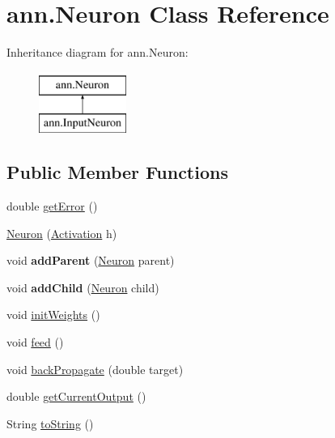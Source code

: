 \hypertarget{classann_1_1_neuron}{}\section{ann.\+Neuron Class Reference}
\label{classann_1_1_neuron}
Inheritance diagram for ann.\+Neuron\+:\begin{figure}[H]
\begin{center}
\leavevmode
\includegraphics[height=2.000000cm]{classann_1_1_neuron}
\end{center}
\end{figure}
\subsection*{Public Member Functions}
\begin{DoxyCompactItemize}
\item 
double \hyperlink{classann_1_1_neuron_adaea18e61d0a87b9e47cc41c552417dd}{get\+Error} ()
\item 
\hyperlink{classann_1_1_neuron_ab0f583ed1a1c83ed5ff5bc24c77db902}{Neuron} (\hyperlink{interfaceann_1_1_activation}{Activation} h)
\item 
\mbox{\label{classann_1_1_neuron_a0ba98646afe2473db08616ceffe80551}} 
void {\bfseries add\+Parent} (\hyperlink{classann_1_1_neuron}{Neuron} parent)
\item 
\mbox{\label{classann_1_1_neuron_a84df35de6af704840e26dd618ea62cdf}} 
void {\bfseries add\+Child} (\hyperlink{classann_1_1_neuron}{Neuron} child)
\item 
void \hyperlink{classann_1_1_neuron_aa1544b3c4a7e5a002eef88277126d4f5}{init\+Weights} ()
\item 
void \hyperlink{classann_1_1_neuron_aaae37fc2d90b1f42b4fd4ba00e23dc04}{feed} ()
\item 
void \hyperlink{classann_1_1_neuron_acb5bda80a06130b2c68bba370ee27a84}{back\+Propagate} (double target)
\item 
double \hyperlink{classann_1_1_neuron_ae8c43d9defae7bb44d8562382474f87c}{get\+Current\+Output} ()
\item 
String \hyperlink{classann_1_1_neuron_a22d903dc7a9e7693b77c3b407359a78a}{to\+String} ()
\end{DoxyCompactItemize}
